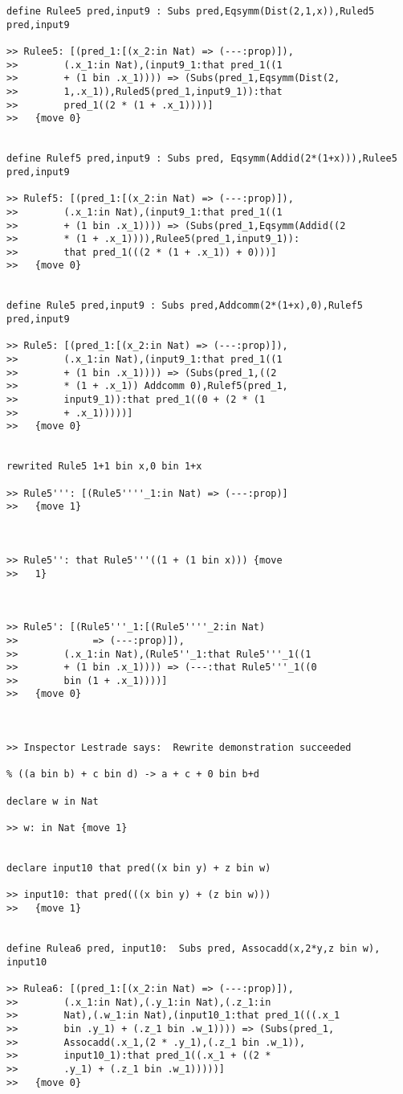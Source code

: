 \documentclass{article}
\begin{document}
\begin{verbatim}
define Rulee5 pred,input9 : Subs pred,Eqsymm(Dist(2,1,x)),Ruled5 pred,input9

>> Rulee5: [(pred_1:[(x_2:in Nat) => (---:prop)]),
>>        (.x_1:in Nat),(input9_1:that pred_1((1 
>>        + (1 bin .x_1)))) => (Subs(pred_1,Eqsymm(Dist(2,
>>        1,.x_1)),Ruled5(pred_1,input9_1)):that 
>>        pred_1((2 * (1 + .x_1))))]
>>   {move 0}


define Rulef5 pred,input9 : Subs pred, Eqsymm(Addid(2*(1+x))),Rulee5 pred,input9

>> Rulef5: [(pred_1:[(x_2:in Nat) => (---:prop)]),
>>        (.x_1:in Nat),(input9_1:that pred_1((1 
>>        + (1 bin .x_1)))) => (Subs(pred_1,Eqsymm(Addid((2 
>>        * (1 + .x_1)))),Rulee5(pred_1,input9_1)):
>>        that pred_1(((2 * (1 + .x_1)) + 0)))]
>>   {move 0}


define Rule5 pred,input9 : Subs pred,Addcomm(2*(1+x),0),Rulef5 pred,input9

>> Rule5: [(pred_1:[(x_2:in Nat) => (---:prop)]),
>>        (.x_1:in Nat),(input9_1:that pred_1((1 
>>        + (1 bin .x_1)))) => (Subs(pred_1,((2 
>>        * (1 + .x_1)) Addcomm 0),Rulef5(pred_1,
>>        input9_1)):that pred_1((0 + (2 * (1 
>>        + .x_1)))))]
>>   {move 0}


rewrited Rule5 1+1 bin x,0 bin 1+x

>> Rule5''': [(Rule5''''_1:in Nat) => (---:prop)]
>>   {move 1}



>> Rule5'': that Rule5'''((1 + (1 bin x))) {move 
>>   1}



>> Rule5': [(Rule5'''_1:[(Rule5''''_2:in Nat) 
>>             => (---:prop)]),
>>        (.x_1:in Nat),(Rule5''_1:that Rule5'''_1((1 
>>        + (1 bin .x_1)))) => (---:that Rule5'''_1((0 
>>        bin (1 + .x_1))))]
>>   {move 0}



>> Inspector Lestrade says:  Rewrite demonstration succeeded

% ((a bin b) + c bin d) -> a + c + 0 bin b+d

declare w in Nat

>> w: in Nat {move 1}


declare input10 that pred((x bin y) + z bin w)

>> input10: that pred(((x bin y) + (z bin w))) 
>>   {move 1}


define Rulea6 pred, input10:  Subs pred, Assocadd(x,2*y,z bin w), input10

>> Rulea6: [(pred_1:[(x_2:in Nat) => (---:prop)]),
>>        (.x_1:in Nat),(.y_1:in Nat),(.z_1:in 
>>        Nat),(.w_1:in Nat),(input10_1:that pred_1(((.x_1 
>>        bin .y_1) + (.z_1 bin .w_1)))) => (Subs(pred_1,
>>        Assocadd(.x_1,(2 * .y_1),(.z_1 bin .w_1)),
>>        input10_1):that pred_1((.x_1 + ((2 * 
>>        .y_1) + (.z_1 bin .w_1)))))]
>>   {move 0}



\end{verbatim}
\end{document}

